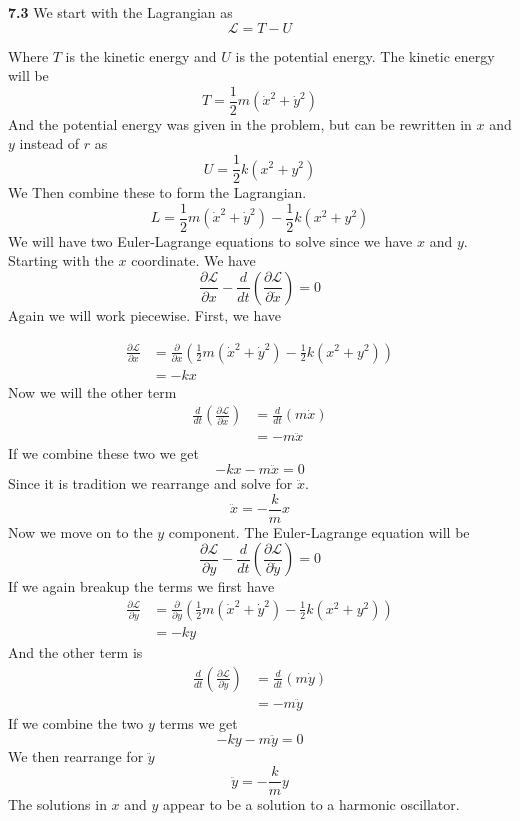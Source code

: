 \documentclass[11pt, leqno]{article}
\begin{document}
\bigskip

\noindent \textbf{7.3}
We start with the Lagrangian as 
$$ 
\mathcal{L} = T - U 
$$ 

Where $T$ is the kinetic energy and $U$ is the potential energy. The kinetic energy will be 
$$ 
T = \frac{1}{2}m(\dot{x}^2 + \dot{y}^2)
$$
And the potential energy was given in the problem, but can be rewritten in $x$ and $y$ instead of $r$ as 
$$ 
U = \frac{1}{2}k(x^2 + y^2)
$$
We Then combine these to form the Lagrangian. 
$$ 
L = \frac{1}{2}m(\dot{x}^2 + \dot{y}^2) - \frac{1}{2}k(x^2 + y^2)
$$
We will have two Euler-Lagrange equations to solve since we have $x$ and $y$. Starting with the $x$ coordinate. We have 
$$
\frac{\partial \mathcal{L}}{\partial x} - \frac{d}{dt}\left(\frac{\partial \mathcal{L}}{\partial \dot{x}}\right) = 0
$$
Again we will work piecewise. First, we have 

\begin{align*}
\frac{\partial \mathcal{L}}{\partial x} &= \frac{\partial}{\partial x}\left( \frac{1}{2}m(\dot{x}^2 + \dot{y}^2) - \frac{1}{2}k(x^2 + y^2) \right)  \\
&= -kx 
\end{align*}
Now we will the other term 
\begin{align*}
\frac{d}{dt}\left(\frac{\partial \mathcal{L}}{\partial \dot{x}}\right) &= \frac{d}{dt}\left(m\dot{x}\right) \\
&= -m\ddot{x}
\end{align*}
If we combine these two we get 
$$ 
-kx -m\ddot{x} = 0 
$$
Since it is tradition we rearrange and solve for $\ddot{x}$.
$$
\boxed{\ddot{x} = - \frac{k}{m} x }
$$
Now we move on to the $y$ component. The Euler-Lagrange equation will be 
$$
\frac{\partial \mathcal{L}}{\partial y} - \frac{d}{dt}\left(\frac{\partial \mathcal{L}}{\partial \dot{y}}\right) = 0
$$
If we again breakup the terms we first have 
\begin{align*}
\frac{\partial \mathcal{L}}{\partial y} &= \frac{\partial}{\partial y} \left( \frac{1}{2}m(\dot{x}^2 + \dot{y}^2) - \frac{1}{2}k(x^2 + y^2) \right) \\
&= -ky
\end{align*}
And the other term is 
\begin{align*}
\frac{d}{dt}\left(\frac{\partial \mathcal{L}}{\partial \dot{y}}\right) &= \frac{d}{dt}\left(m\dot{y}\right) \\
&= -m\ddot{y}
\end{align*}
If we combine the two $y$ terms we get 
$$
-ky - m\ddot{y} = 0
$$
We then rearrange for $\ddot{y}$ 
$$ 
\boxed{\ddot{y} = -\frac{k}{m} y }
$$
The solutions in $x$ and $y$ appear to be a solution to a harmonic oscillator. 
\end{document}
